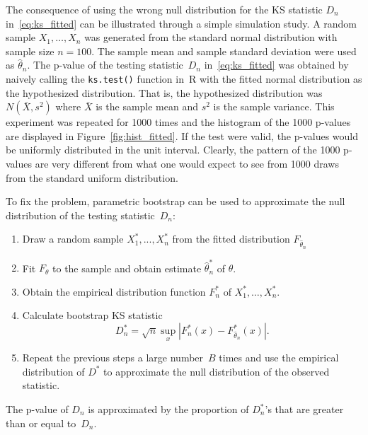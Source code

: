 \documentclass[12pt, letterpaper, titlepage]{article}
\begin{document}
The consequence of using the wrong null distribution for the KS statistic $D_n$
in~\eqref{eq:ks_fitted} can be illustrated through a simple simulation study. A
random sample $X_1, \ldots, X_n$ was generated from the standard normal
distribution with sample size $n = 100$. The sample mean and sample standard
deviation were used as $\hat\theta_n$. The p-value of the testing
statistic~$D_n$ in~\eqref{eq:ks_fitted} was obtained by naively calling the
\texttt{ks.test()} function in~R with the fitted normal distribution as the
hypothesized distribution. That is, the hypothesized distribution was
$N(\bar X, s^2)$ where $\bar X$ is the sample mean and $s^2$ is the sample
variance. This experiment was repeated for 1000 times and the histogram of the
1000 p-values are displayed in Figure~\ref{fig:hist_fitted}. If the test were
valid, the p-values would be uniformly distributed in the unit
interval. Clearly, the pattern of the 1000 p-values are very different from what
one would expect to see from 1000 draws from the standard uniform
distribution.


To fix the problem, parametric bootstrap can be used to approximate the null
distribution of the testing statistic~$D_n$:
\begin{enumerate}
\item
  Draw a random sample $X_1^*,...,X_n^*$ from the fitted distribution
  $F_{\hat\theta_n}$
\item
  Fit $F_\theta$ to the sample and obtain estimate $\hat\theta_n^*$ of $\theta$.
\item
  Obtain the empirical distribution function $F_n^*$ of
  $X_1^*, \ldots,  X_n^*$.
\item
  Calculate bootstrap KS statistic
  \[
    D_n^* = \sqrt{n} \sup_x | F_n^* (x)- F_{\hat\theta_n}^*(x) |.
  \]
\item
  Repeat the previous steps a large number~$B$ times and use the empirical
  distribution of $D^*$ to approximate the null distribution of the observed
  statistic.
\end{enumerate}
The p-value of $D_n$ is approximated by the proportion of $D_n^*$'s that are
greater than or equal to~$D_n$.
\end{document}
